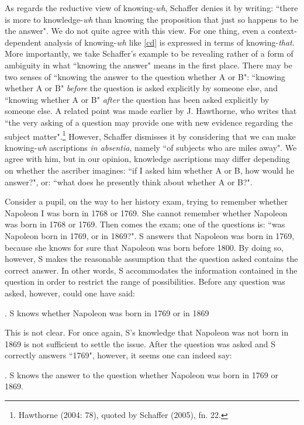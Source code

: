 As regards the reductive view of knowing-\emph{wh}, Schaffer
denies it by writing: ``there is more to knowledge-\emph{wh} than
knowing the proposition that just so happens to be the answer". We
do not quite agree with this view. For one thing, even a
context-dependent analysis of knowing-\emph{wh} like \ref{cd} is
expressed in terms of knowing-\emph{that}. More importantly, we
take Schaffer's example to be revealing rather of a form of
ambiguity in what ``knowing the answer" means in the first place.
There may be two senses of ``knowing the answer to the question
whether A or B": ``knowing whether A or B" \emph{before} the
question is asked explicitly by someone else, and ``knowing
whether A or B" \emph{after} the question has been asked
explicitly by someone else. A related point was made earlier by J.
Hawthorne, who writes that ``the very asking of a question may
provide one with new evidence regarding the subject
matter".\footnote{Hawthorne (2004: 78), quoted by Schaffer (2005),
fn. 22.} However, Schaffer dismisses it by considering that we can
make knowing-\emph{wh} ascriptions \emph{in absentia}, namely ``of
subjects who are miles away". We agree with him, but in our
opinion, knowledge ascriptions may differ depending on whether the
ascriber imagines: ``if I asked him whether A or B, how would he
answer?", or: ``what does he presently think about whether A or
B?".

Consider a pupil, on the way to her history exam, trying to
remember whether Napoleon I was born in 1768 or 1769. She cannot
remember whether Napoleon was born in 1768 or 1769. Then comes the
exam; one of the questions is: ``was Napoleon born in 1769, or in
1869?". S answers that Napoleon was born in 1769, because she
knows for sure that Napoleon was born before 1800. By doing so,
however, S makes the reasonable assumption that the question asked
contains the correct answer. In other words, S accommodates the
information contained in the question in order to restrict the
range of possibilities. Before any question was asked, however,
could one have said:

\ex. S knows whether Napoleon was born in 1769 or in 1869

This is not clear. For once again, S's knowledge that Napoleon was
not born in 1869 is not sufficient to settle the issue. After the
question was asked and S correctly answers ``1769", however, it
seems one can indeed say:

\ex. S knows the answer to the question whether Napoleon was born
in 1769 or 1869.

